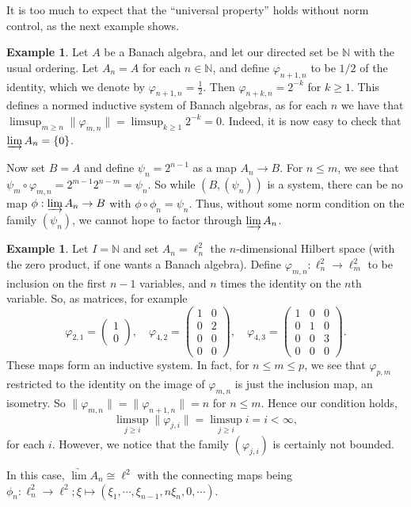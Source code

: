 \documentclass[a4paper,11pt]{article}
\newcommand{\indlim}{\varinjlim}
\theoremstyle{definition}
\newtheorem{example}[lemma]{Example}
\begin{document}
It is too much to expect that the ``universal property'' holds without norm control, as the next
example shows.

\begin{example}\label{ex:one}
Let $A$ be a Banach algebra, and let our directed set be $\mathbb N$ with the usual ordering.
Let $A_n = A$ for each $n\in\mathbb N$, and define $\varphi_{n+1,n}$ to be $1/2$ of the identity,
which we denote by $\varphi_{n+1,n} = \frac12$.  Then $\varphi_{n+k,n} = 2^{-k}$ for $k\geq 1$.
This defines a normed inductive system of Banach algebras, as for each $n$ we have that
$\limsup_{m\geq n} \|\varphi_{m,n}\| = \limsup_{k\geq 1} 2^{-k} = 0$.  Indeed, it is now easy to
check that $\indlim A_n = \{0\}$.

Now set $B=A$ and define $\psi_n = 2^{n-1}$ as a map $A_n\rightarrow B$.  For $n\leq m$, we see that
$\psi_m \circ \varphi_{m,n} = 2^{m-1} 2^{n-m} = \psi_n$.  So while $(B, (\psi_n))$ is a system,
there can be no map $\phi:\indlim A_n\rightarrow B$ with $\phi\circ\phi_n = \psi_n$.  Thus, without
some norm condition on the family $(\psi_n)$, we cannot hope to factor through $\indlim A_n$.
\end{example}

\begin{example}\label{ex:nontriv}
Let $I=\mathbb N$ and set $A_n = \ell^2_n$ the $n$-dimensional Hilbert space (with the zero product, if one wants a Banach algebra).  Define $\varphi_{m,n} \colon \ell^2_n \to \ell^2_m$ to be inclusion on the first $n-1$ variables, and $n$ times the identity on the $n$th variable.  So, as matrices, for example
\[ \varphi_{2,1} = \begin{pmatrix} 1 \\ 0 \end{pmatrix}, \quad
\varphi_{4,2} = \begin{pmatrix} 1 & 0 \\ 0 & 2 \\ 0 & 0 \\ 0 & 0 \end{pmatrix}, \quad
\varphi_{4,3} = \begin{pmatrix} 1 & 0 & 0 \\ 0 & 1 & 0 \\ 0 & 0 & 3 \\ 0 & 0 & 0 \end{pmatrix}. \]
These maps form an inductive system.  In fact, for $n\leq m\leq p$, we see that $\varphi_{p,m}$ restricted to the identity on the image of $\varphi_{m,n}$ is just the inclusion map, an isometry.  So $\|\varphi_{m,n}\| = \|\varphi_{n+1,n}\| = n$ for $n\leq m$.  Hence our condition holds,
\[ \limsup_{j\geq i} \|\varphi_{j,i}\| = \limsup_{j\geq i} i = i < \infty, \]
for each $i$.  However, we notice that the family $(\varphi_{j,i})$ is certainly not bounded.

In this case, $\underrightarrow{\lim} A_n \cong \ell^2$ with the connecting maps being $\phi_n \colon \ell^2_n \to \ell^2; \xi \mapsto (\xi_1,\cdots,\xi_{n-1}, n\xi_n, 0,\cdots)$.
\end{example}
\end{document}
